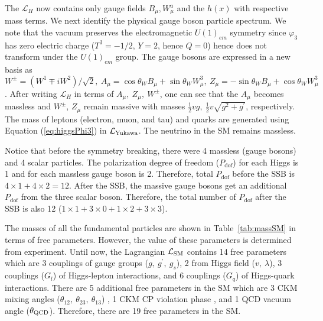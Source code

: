 \begin{itemize}[leftmargin=*]
The $\mathcal{L}_H$ now contains only gauge fields $B_\mu, W_\mu^a$ and
the $h(x)$ with respective mass terms. We next identify the physical
gauge boson particle spectrum. We note that the vacuum preserves
the electromagnetic 
 $U(1)_{em}$ symmetry since 
 $\varphi_3$ has zero electric charge ($T^3 = -1/2$, 
$Y = 2$, hence $Q = 0$) hence does not transform under the 
$U(1)_{em}$ group. The gauge
bosons  are expressed in a new basis as 
$W^\pm = (W^1 \mp iW^2)/ \sqrt{2}, ~A_\mu = \cos\theta_W B_\mu 
+ \sin\theta_W W^3_\mu,
~Z_\mu = -\sin\theta_W B_\mu + \cos\theta_W W^3_\mu$. After writing
$\mathcal{L}_H$ in terms of $A_\mu, ~Z_\mu, ~W^\pm$, one can see that
the $A_\mu$ becomes massless and $W^\pm$, $Z_\mu$ remain
massive with masses $ \frac{1}{2}vg, ~\frac{1}{2}v\sqrt{g^2 + 
g^{\prime}}$, respectively. The mass of leptons (electron, muon, 
and tau) and quarks are generated using Equation (\ref{eq:higgsPhi3})
in $\mathcal{L}_{\rm{Yukawa}}$. The neutrino in the SM remains massless. 
\end{itemize}

Notice that before the symmetry breaking, there were 4 massless (gauge bosons) and 4 
scalar particles. The polarization degree of freedom ($P_{\text{dof}}$) 
for each Higgs is 1 and for each massless gauge boson is 2. 
Therefore, total $P_{\text{dof}}$ before the SSB is $4\times1 + 4\times 
2 = 12$. After the SSB, the massive gauge bosons get an additional $P_{\text{dof}}$
from the three scalar boson. Therefore, the total number of $P_{\text{dof}}$ after the SSB 
is also 12 ($1\times 1 + 3\times 0 + 1\times 2 + 3\times 3$). 

The masses of all the fundamental particles are shown in 
Table~\ref{tab:massSM} in terms of free parameters. However, the value of these 
parameters is determined from experiment.
Until now, the Lagrangian $\mathcal{L}_{\rm{SM}}$ contains 14 free parameters which 
are 3 couplings of gauge groups ($g, ~g^\prime, ~g_s$), 2 from Higgs field 
($v, ~\lambda$), 3 couplings ($G_l$) of Higgs-lepton interactions, and 6 couplings
($G_q$) of Higgs-quark interactions. There are 5 additional free parameters in the
SM which are 3 CKM mixing angles ($\theta_{12}, ~\theta_{23}, ~\theta_{13}$) 
\cite{PhysRevLett.10.531}, 1 CKM CP violation phase \cite{10.1143/PTP.49.652}, 
and 1 QCD vacuum angle ($\theta_{\rm{QCD}}$). Therefore, there are 19 free parameters 
in the SM.

